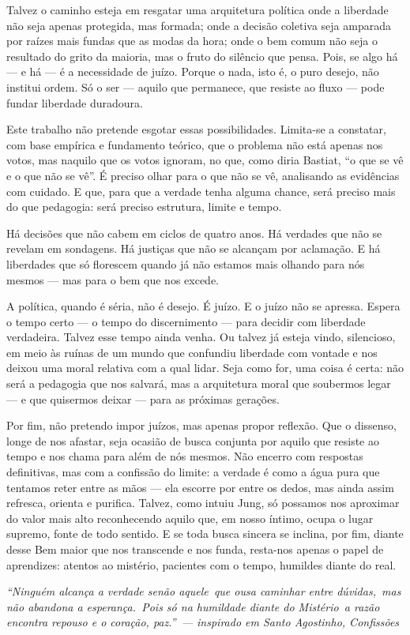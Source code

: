 \begin{apendicesenv}
Talvez o caminho esteja em resgatar uma arquitetura política onde a liberdade não seja apenas protegida, mas formada; onde a decisão coletiva seja amparada por raízes mais fundas que as modas da hora; onde o bem comum não seja o resultado do grito da maioria, mas o fruto do silêncio que pensa. Pois, se algo há — e há — é a necessidade de juízo. Porque o nada, isto é, o puro desejo, não institui ordem. Só o ser — aquilo que permanece, que resiste ao fluxo — pode fundar liberdade duradoura.

Este trabalho não pretende esgotar essas possibilidades. Limita-se a constatar, com base empírica e fundamento teórico, que o problema não está apenas nos votos, mas naquilo que os votos ignoram, no que, como diria Bastiat, “o que se vê e o que não se vê”. É preciso olhar para o que não se vê, analisando as evidências com cuidado. E que, para que a verdade tenha alguma chance, será preciso mais do que pedagogia: será preciso estrutura, limite e tempo.

Há decisões que não cabem em ciclos de quatro anos. Há verdades que não se revelam em sondagens. Há justiças que não se alcançam por aclamação. E há liberdades que só florescem quando já não estamos mais olhando para nós mesmos — mas para o bem que nos excede.

A política, quando é séria, não é desejo. É juízo. E o juízo não se apressa. Espera o tempo certo — o tempo do discernimento — para decidir com liberdade verdadeira. Talvez esse tempo ainda venha. Ou talvez já esteja vindo, silencioso, em meio às ruínas de um mundo que confundiu liberdade com vontade e nos deixou uma moral relativa com a qual lidar. Seja como for, uma coisa é certa: não será a pedagogia que nos salvará, mas a arquitetura moral que soubermos legar — e que quisermos deixar — para as próximas gerações.

Por fim, não pretendo impor juízos, mas apenas propor reflexão. Que o dissenso, longe de nos afastar, seja ocasião de busca conjunta por aquilo que resiste ao tempo e nos chama para além de nós mesmos. Não encerro com respostas definitivas, mas com a confissão do limite: a verdade é como a água pura que tentamos reter entre as mãos — ela escorre por entre os dedos, mas ainda assim refresca, orienta e purifica. Talvez, como intuiu Jung, só possamos nos aproximar do valor mais alto reconhecendo aquilo que, em nosso íntimo, ocupa o lugar supremo, fonte de todo sentido. E se toda busca sincera se inclina, por fim, diante desse Bem maior que nos transcende e nos funda, resta-nos apenas o papel de aprendizes: atentos ao mistério, pacientes com o tempo, humildes diante do real.

\begin{flushright}
\textit{
“Ninguém alcança a verdade senão aquele\
que ousa caminhar entre dúvidas,\
mas não abandona a esperança.\
Pois só na humildade diante do Mistério\
a razão encontra repouso e o coração, paz.”\
— inspirado em Santo Agostinho, Confissões
}
\end{flushright}

\end{apendicesenv}
